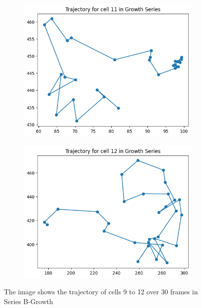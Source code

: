 \documentclass{article}
\begin{document}
\begin{figure}[h!]
\begin{subfigure}[b]{0.5\linewidth}
        \centering
        \includegraphics[width=\linewidth]{Report/Appendix_Images/Trajectory-B-Growth/trajectory_11.png}
    \end{subfigure}%
    \begin{subfigure}[b]{0.5\linewidth}
        \centering
        \includegraphics[width=\linewidth]{Report/Appendix_Images/Trajectory-B-Growth/trajectory_12.png}
    \end{subfigure}
    \caption{The image shows the trajectory of cells 9 to 12 over 30 frames in Series B-Growth}
    \label{fig:Trajectory-GrowthSeries-9-12}
\end{figure}
\end{document}
